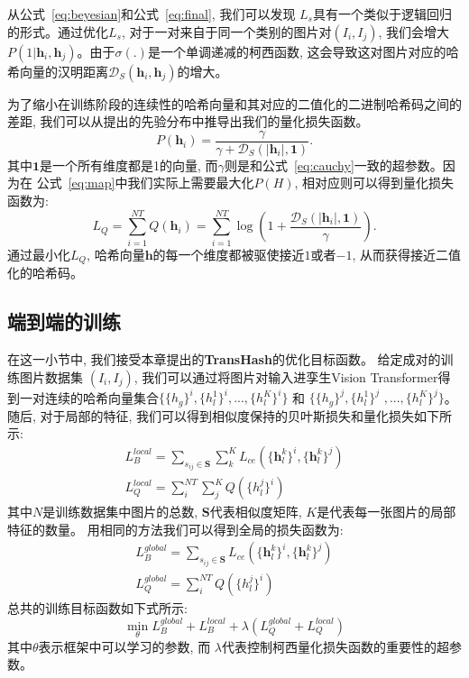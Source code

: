 从公式~\ref{eq:beyesian}和公式~\ref{eq:final}, 我们可以发现 $L_{s}$具有一个类似于逻辑回归的形式。通过优化$L_{s}$,  对于一对来自于同一个类别的图片对$(I_i,I_j)$, 我们会增大$P(1|\textbf{h}_i,\textbf{h}_j)$。由于$\sigma(.)$是一个单调递减的柯西函数, 这会导致这对图片对应的哈希向量的汉明距离$\mathcal{D}_S(\mathbf{h}_i, \mathbf{h}_j)$的增大。\par
为了缩小在训练阶段的连续性的哈希向量和其对应的二值化的二进制哈希码之间的差距, 我们可以从提出的先验分布中推导出我们的量化损失函数。
\begin{equation}
    P\left(\boldsymbol{h}_{i}\right)=\frac{\gamma}{\gamma+\mathcal{D}_S\left(\left|\boldsymbol{h}_{i}\right|, \mathbf{1}\right)}.
\end{equation}
其中$\mathbf{1}$是一个所有维度都是1的向量, 而$\gamma$则是和公式~\ref{eq:cauchy}一致的超参数。因为在 公式~\ref{eq:map}中我们实际上需要最大化$P(H)$, 相对应则可以得到量化损失函数为: 
\begin{equation}
    L_Q =  \sum_{i=1}^{NT} Q(\boldsymbol{h}_i)=\sum_{i=1}^{NT} \log \left(1+\frac{\mathcal{D}_S\left(\left|\boldsymbol{h}_{i}\right|, \mathbf{1}\right)}{\gamma}\right).
\label{eq:quant}
  \end{equation}
通过最小化$L_Q$, 哈希向量$\mathbf{h}$的每一个维度都被驱使接近$1$或者$-1$, 从而获得接近二值化的哈希码。
\subsection{端到端的训练}
在这一小节中, 我们接受本章提出的\textbf{TransHash}的优化目标函数。 给定成对的训练图片数据集
$(I_i,I_j)$, 我们可以通过将图片对输入进孪生Vision Transformer得到一对连续的哈希向量集合$\{\{h_g\}^i,\{h_l^1\}^i,...,\{h_l^K\}^i\}$ 和 $\{\{h_g\}^j,\{h_l^1\}^j$ $,...,\{h_l^K\}^j\}$。随后, 对于局部的特征, 我们可以得到相似度保持的贝叶斯损失和量化损失如下所示:
\begin{equation}
    \begin{aligned}
        L_{B}^{local} = \sum_{s_{i j} \in \mathbf{S} } \sum_{k}^K L_{ce}(\{\textbf{h}_l^k \}^i,\{\textbf{h}_l^k \}^j) \\
        L_{Q}^{local} = \sum_i^{NT} \sum_j^K Q(\{h_l^j\}^i)
    \end{aligned}
    \end{equation}
其中$N$是训练数据集中图片的总数, $\mathbf{S}$代表相似度矩阵, $K$是代表每一张图片的局部特征的数量。 用相同的方法我们可以得到全局的损失函数为:
\begin{equation}
    \begin{aligned}
        L_{B}^{global} = \sum_{s_{i j} \in \mathbf{S} }  L_{ce}(\{\textbf{h}_l^k \}^i,\{\textbf{h}_l^k \}^j) \\
        L_{Q}^{global} = \sum_i^{NT} Q(\{h_l^j\}^i)
    \end{aligned}
    \end{equation}
总共的训练目标函数如下式所示:
\begin{equation}
    \min_{\theta} L_B^{global} + L_B^{local} + \lambda (L_Q^{global} + L_Q^{local})
\end{equation}
其中$\theta$表示框架中可以学习的参数, 而 $\lambda$代表控制柯西量化损失函数的重要性的超参数。
